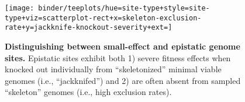\begin{figure}
  \centering
  \footnotesize
  \texttt{[image: binder/teeplots/hue=site-type+style=site-type+viz=scatterplot-rect+x=skeleton-exclusion-rate+y=jackknife-knockout-severity+ext=]}
  \vspace{-0.25in}
  \caption{%
    \textbf{Distinguishing between small-effect and epistatic genome sites.}
    Epistatic sites exhibit both 1) severe fitness effects when knocked out individually from ``skeletonized'' minimal viable genomes (i.e., ``jackknifed'') and 2) are often absent from sampled ``skeleton'' genomes (i.e., high exclusion rates).
  }
  \label{fig:epistatic}
  \vspace{-0.25in}
\end{figure}
